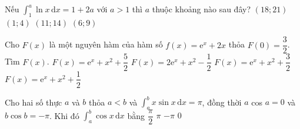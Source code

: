 \begin{ex}%
Nếu $\displaystyle\int_1^a\ln x \mathrm{\, d}x=1+2 a$ với $a>1$ thì $a$ thuộc khoảng nào sau đây?
\choice
{\True $(18; 21)$}
{$(1; 4)$}
{$(11; 14)$}
{$(6; 9)$}
\end{ex}

\begin{ex}%
Cho $ F(x) $ là một nguyên hàm của hàm số $ f(x)= \mathrm{e}^x+2x$ thỏa $ F(0)=\dfrac{3}{2} $. Tìm $ F(x) $.
\choice
{$ F(x)=\mathrm{e}^x+x^2+\dfrac{5}{2} $}
{$ F(x)=2\mathrm{e}^x+x^2-\dfrac{1}{2} $}
{$ F(x)=\mathrm{e}^x+x^2+\dfrac{3}{2} $}
{\True $ F(x)=\mathrm{e}^x+x^2+\dfrac{1}{2} $}
\end{ex}

\begin{ex}%
Cho hai số thực $a$ và $b$ thỏa $a<b$ và $\displaystyle\int_a^b x\sin x \mathrm{\,d}x=\pi$, đồng thời $a$ cos $a=0$ và $b\cos b=-\pi$. Khi đó $\displaystyle\int_a^b\cos x \mathrm{\,d}x$ bằng
\choice
{$\dfrac{\pi}{2}$}
{$\pi$}
{$-\pi$}
{\True $0$}
\end{ex}

